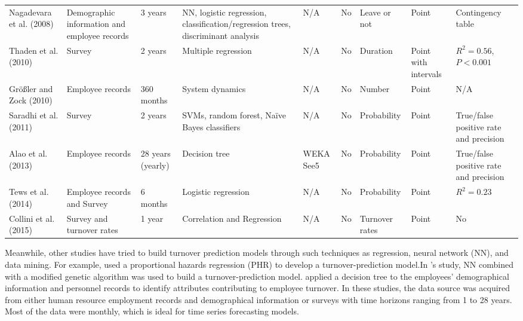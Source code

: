 \begin{landscape}
\begin{table}[htbp]
\begin{tabular}{L{2.8cm}  L{2.8cm}  C{1.2cm}  L{3cm} C{1.2cm}  C{1.5cm} C{1.5cm} C{1.5cm}  L{2.8cm}}
			Nagadevara et al. (2008) & Demographic information and employee records & 3 years & NN, logistic regression, classification/regression trees, discriminant analysis & N/A   & No    & Leave or not & Point & Contingency table \\
			
			Thaden et al. (2010) & Survey & 2 years & Multiple regression & N/A   & No    & Duration & Point with intervals &  $R^2=0.56$, $P< 0.001$ \\
			
			Größler and Zock (2010) & Employee records & 360 months & System dynamics  & N/A   & No    & Number & Point & N/A \\
			
			Saradhi et al. (2011) & Survey & 2 years & SVMs, random forest,  Naïve Bayes classifiers & N/A   & No    & Probability  & Point & True/false positive rate and precision \\
			
			Alao et al. (2013) &  Employee records   & 28 years (yearly) & Decision tree & WEKA See5 & No    & Probability  & Point & True/false positive rate and precision \\
			Tews et al. (2014) & Employee records and Survey & 6 months & Logistic regression & N/A   & No    & Probability & Point & $R^2=0.23$ \\
			Collini et al. (2015) & Survey and turnover rates   & 1 year & Correlation and Regression & N/A   & No    & Turnover rates & Point & No \\
			
			\bottomrule
		\end{tabular}%
		\label{tab:1}%
	\end{table}%
\end{landscape}

Meanwhile, other studies have tried to build turnover prediction models through such techniques as regression, neural network (NN), and data mining. For example, \citet{ng1991} used a proportional hazards regression (PHR) to develop a turnover-prediction model.In \citet{sexton2005}'s study, NN combined with a modified genetic algorithm was used to build a turnover-prediction model. \citet{alao2013} applied a decision tree to the employees' demographical information and personnel records to identify attributes contributing to employee turnover. In these studies, the data source was acquired from either human resource employment records and demographical information or surveys with time horizons ranging from 1 to 28 years. Most of the data were monthly, which is ideal for time series forecasting models.

